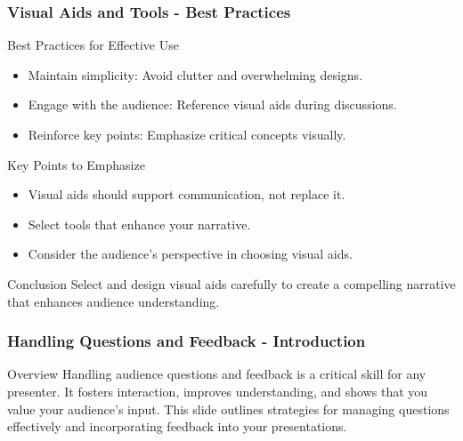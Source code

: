 \documentclass{beamer}
\begin{document}
\begin{frame}[fragile]
    \frametitle{Visual Aids and Tools - Best Practices}
    \begin{block}{Best Practices for Effective Use}
        \begin{itemize}
            \item Maintain simplicity: Avoid clutter and overwhelming designs.
            \item Engage with the audience: Reference visual aids during discussions.
            \item Reinforce key points: Emphasize critical concepts visually.
        \end{itemize}
    \end{block}
    
    \begin{block}{Key Points to Emphasize}
        \begin{itemize}
            \item Visual aids should support communication, not replace it.
            \item Select tools that enhance your narrative.
            \item Consider the audience's perspective in choosing visual aids.
        \end{itemize}
    \end{block}
    
    \begin{block}{Conclusion}
        Select and design visual aids carefully to create a compelling narrative that enhances audience understanding.
    \end{block}
\end{frame}

\begin{frame}[fragile]
    \frametitle{Handling Questions and Feedback - Introduction}
    \begin{block}{Overview}
        Handling audience questions and feedback is a critical skill for any presenter. 
        It fosters interaction, improves understanding, and shows that you value your audience's input. 
        This slide outlines strategies for managing questions effectively and incorporating feedback into your presentations.
    \end{block}
\end{frame}
\end{document}
